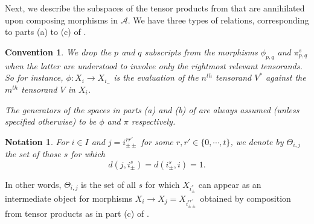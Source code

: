 \documentclass[11pt]{article}
\theoremstyle{plain}
\theoremstyle{nonumberplain}
\theoremstyle{plain}
\newtheorem{notation}[lemma]{Notation}
\newtheorem{convention}[lemma]{Convention}
\theoremstyle{nonumberplain}
\newcommand\cA{\mathcal A}
\begin{document}
Next, we describe the subspaces of the tensor products from
 that are annihilated upon composing morphisms in
$\cA$. We have three types of relations, corresponding to parts (a) to
(c) of .





\begin{convention}\label{cv.ppi}
  We drop the $p$ and $q$ subscripts from the morphisms $\phi_{p,q}$
  and $\pi^s_{p,q}$ when the latter are understood to involve only the
  rightmost relevant tensorands. So for instance,
  $\phi:X_i\to X_{i_-}$ is the evaluation of the $n^{th}$
  tensorand $V^*$ against the $m^{th}$ tensorand $V$ in $X_i$.

  The generators of the spaces in parts (a) and (b) of 
  are always assumed (unless specified otherwise) to be $\phi$ and
  $\pi$ respectively.
\end{convention}

\begin{notation}\label{not.theta}
  For $i\in I$ and $j=i^{rr'}_{\pm\pm}$ for some
  $r,r'\in \{0,\cdots,t\}$, we denote by $\Theta_{i,j}$ the set of
  those $s$ for which
  \begin{equation*}
    d(j,i^s_\pm) = d(i^s_\pm,i) = 1. 
  \end{equation*}
\end{notation}



In other words, $\Theta_{i,j}$ is the set of all $s$ for which
$X_{i^s_{\pm}}$ can appear as an intermediate object for morphisms
$X_i\to X_j=X_{i^{rr'}_{\pm\pm}}$ obtained by composition from tensor
products as in part (c) of .
\end{document}
